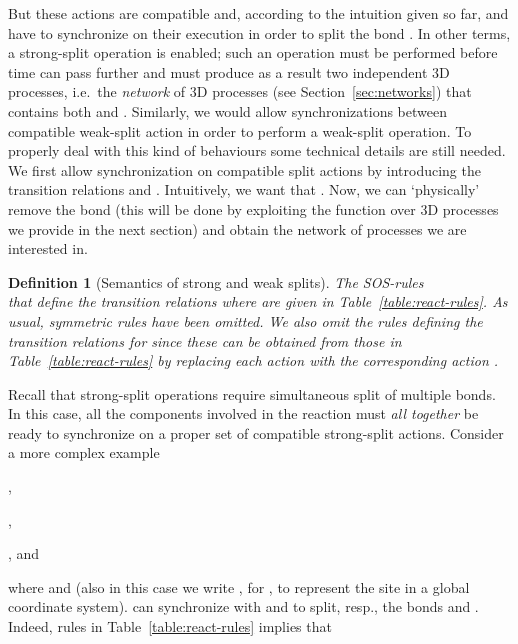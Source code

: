 \documentclass[11pt]{article}
\newtheorem{definition}{Definition}
\begin{document}
But these actions are compatible and, according to the intuition given so far,  and  have to synchronize on their execution in order to split the bond . In other terms, a strong-split operation is enabled; such an operation must be performed before time can pass further and must produce as a result two independent 3D processes, i.e.\ the {\em network} of 3D processes (see Section~\ref{sec:networks}) that contains both  and . Similarly, we would allow synchronizations between compatible weak-split action in order to perform a weak-split operation. To properly deal with this kind of behaviours some technical details are still needed. We first allow synchronization on compatible split actions by introducing the transition relations   and . Intuitively, we want that  . Now, we can `physically' remove the bond  (this will be done by exploiting the function  over 3D processes we provide in the next section) and obtain the network of processes we are interested in.

\begin{definition}[Semantics of strong and weak splits] \label{def:splittings}
The SOS-rules \\ \noindent that define the transition relations  where  are given in Table~\ref{table:react-rules}.
As usual, symmetric rules have been omitted. We also omit the rules defining the transition
relations  for  since these  can be obtained from those in Table~\ref{table:react-rules}
by replacing each action  with the corresponding action .
\end{definition}


\begin{table}[bh]

\caption{Transitional semantics for strong-split actions}
\label{table:react-rules}
\end{table}

Recall that strong-split operations require simultaneous split of multiple bonds. In
this case, all the components involved in the reaction must {\em all together} be ready to
synchronize on a proper set of compatible strong-split actions. Consider a more complex example
\begin{description}
\item ,
\item ,
\item , and 
\end{description}


where  and  (also in this case we write , for , to represent the site  in a global coordinate system).   can
synchronize with  and  to split, resp., the bonds  and . Indeed, rules in Table~\ref{table:react-rules} implies that
\end{document}
